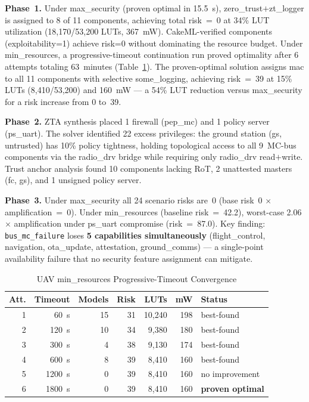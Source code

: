 \documentclass[conference]{IEEEtran}
\begin{document}
\textbf{Phase~1.} Under max\_security (proven optimal in 15.5~s),
zero\_trust$+$zt\_logger is assigned to 8 of 11 components, achieving total
risk~=~0 at 34\% LUT utilization (18,170/53,200 LUTs, 367~mW).
CakeML-verified components (exploitability=1) achieve risk=0 without
dominating the resource budget.
Under min\_resources, a progressive-timeout continuation run proved
optimality after 6 attempts totaling 63~minutes (Table~\ref{tab:convergence}).
The proven-optimal solution assigns mac to all 11 components with selective
some\_logging, achieving risk~=~39 at 15\% LUTs (8,410/53,200) and 160~mW
--- a 54\% LUT reduction versus max\_security for a risk increase from 0
to~39.

\textbf{Phase~2.} ZTA synthesis placed 1 firewall (pep\_mc) and 1 policy
server (ps\_uart). The solver identified 22 excess privileges: the ground
station (gs, untrusted) has 10\% policy tightness, holding topological
access to all 9~MC-bus components via the radio\_drv bridge while
requiring only radio\_drv read$+$write. Trust anchor analysis found 10
components lacking RoT, 2 unattested masters (fc, gs), and 1 unsigned
policy server.

\textbf{Phase~3.} Under max\_security all 24 scenario risks are~0 (base
risk~0 $\times$ amplification~=~0). Under min\_resources (baseline
risk~=~42.2), worst-case 2.06$\times$ amplification under ps\_uart
compromise (risk~=~87.0).
Key finding: \texttt{bus\_mc\_failure} loses \textbf{5 capabilities
simultaneously} (flight\_control, navigation, ota\_update, attestation,
ground\_comms) --- a single-point availability failure that no security
feature assignment can mitigate.

\begin{table}[t]
\caption{UAV min\_resources Progressive-Timeout Convergence}
\label{tab:convergence}
\centering
\scriptsize
\begin{tabular}{rrrrrrl}
\toprule
Att. & Timeout & Models & Risk & LUTs & mW & Status \\
\midrule
1 &   60~s & 15 & 31 & 10,240 & 198 & best-found \\
2 &  120~s & 10 & 34 &  9,380 & 180 & best-found \\
3 &  300~s &  4 & 38 &  9,130 & 174 & best-found \\
4 &  600~s &  8 & 39 &  8,410 & 160 & best-found \\
5 & 1200~s &  0 & 39 &  8,410 & 160 & no improvement \\
6 & 1800~s &  0 & 39 &  8,410 & 160 & \textbf{proven optimal} \\
\bottomrule
\end{tabular}
\end{table}
\end{document}
